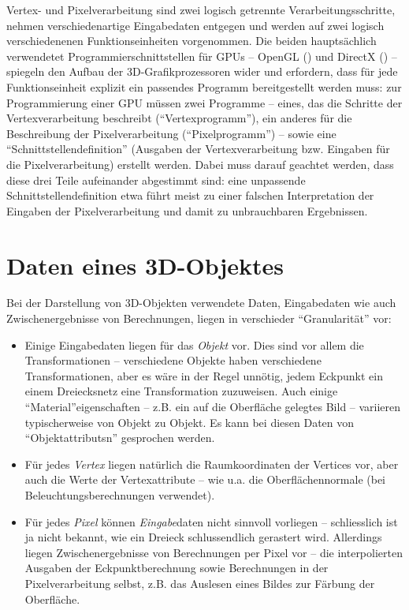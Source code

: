 \documentclass[twoside,a4paper,fleqn,12pt]{book}
\begin{document}
Vertex- und Pixelverarbeitung sind zwei logisch getrennte Verarbeitungsschritte, nehmen verschiedenartige Eingabedaten entgegen und
werden auf zwei logisch verschiedenenen Funktionseinheiten vorgenommen. 
Die beiden hauptsächlich verwendetet Programmierschnittstellen für GPUs -- OpenGL (\cite{glspec4}) und DirectX (\cite{dx10}) -- spiegeln 
den Aufbau der 3D-Grafikprozessoren wider und erfordern, dass für jede Funktionseinheit explizit ein passendes Programm bereitgestellt werden muss:
zur Programmierung einer GPU müssen zwei Programme -- eines, das die Schritte der Vertexverarbeitung beschreibt ("`Vertexprogramm"'),
ein anderes für die Beschreibung der Pixelverarbeitung ("`Pixelprogramm"')
-- sowie eine "`Schnittstellendefinition"' (Ausgaben der Vertexverarbeitung bzw. Eingaben für die Pixelverarbeitung) erstellt werden.
Dabei muss darauf geachtet werden, dass diese drei Teile aufeinander abgestimmt sind: eine unpassende Schnittstellendefinition etwa
führt meist zu einer falschen Interpretation der Eingaben der Pixelverarbeitung und damit zu unbrauchbaren Ergebnissen.

\section{Daten eines 3D-Objektes}
\label{object_data}

Bei der Darstellung von 3D-Objekten verwendete Daten, Eingabedaten wie auch Zwischenergebnisse von Berechnungen,
liegen in verschieder "`Granularität"' vor:

\begin{itemize}
\item Einige Eingabedaten liegen für das \emph{Objekt} vor.
Dies sind vor allem die Transformationen -- verschiedene Objekte haben verschiedene Transformationen,
aber es wäre in der Regel unnötig, jedem Eckpunkt ein einem Dreiecksnetz eine Transformation zuzuweisen.
Auch einige "`Material"'eigenschaften -- z.B. ein auf die Oberfläche gelegtes Bild -- variieren typischerweise von Objekt zu Objekt.
Es kann bei diesen Daten von "`\glspl{Objektattribut}n"' gesprochen werden.
\item Für jedes \emph{Vertex} liegen natürlich die Raumkoordinaten der Vertices vor, aber auch 
die Werte der Vertexattribute -- wie u.a. die Oberflächennormale (bei Beleuchtungsberechnungen verwendet).
\item Für jedes \emph{Pixel} können \emph{Eingabe}daten nicht sinnvoll vorliegen -- schliesslich ist ja nicht bekannt, wie ein Dreieck
schlussendlich gerastert wird. Allerdings liegen Zwischenergebnisse von Berechnungen per Pixel vor -- die  interpolierten Ausgaben der
Eckpunktberechnung sowie Berechnungen in der Pixelverarbeitung selbst, z.B. das Auslesen eines Bildes
zur Färbung der Oberfläche.
\end{itemize}
\end{document}
